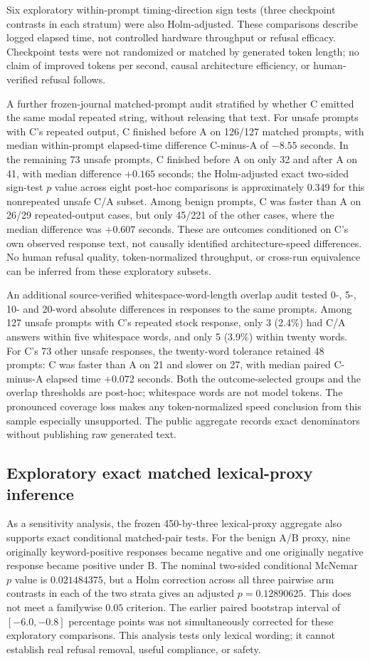 \documentclass[11pt]{article}
\begin{document}
Six exploratory within-prompt timing-direction sign tests
(three checkpoint contrasts in each stratum) were also
Holm-adjusted. These comparisons describe logged elapsed
time, not controlled hardware throughput or refusal efficacy.
Checkpoint tests were not randomized or matched by generated
token length; no claim of improved tokens per second, causal
architecture efficiency, or human-verified refusal follows.

A further frozen-journal matched-prompt audit stratified by whether
C emitted the same modal repeated string, without releasing
that text. For unsafe prompts with C's repeated output,
C finished before A on 126/127 matched prompts, with median
within-prompt elapsed-time difference C-minus-A of
$-8.55$ seconds. In the remaining 73 unsafe prompts,
C finished before A on only 32 and after A on 41,
with median difference $+0.165$ seconds; the
Holm-adjusted exact two-sided sign-test $p$ value across
eight post-hoc comparisons is approximately $0.349$ for
this nonrepeated unsafe C/A subset. Among benign prompts,
C was faster than A on 26/29 repeated-output cases, but
only 45/221 of the other cases, where the median difference
was $+0.607$ seconds. These are outcomes conditioned on
C's own observed response text, not causally identified
architecture-speed differences. No human refusal quality,
token-normalized throughput, or cross-run equivalence can
be inferred from these exploratory subsets.

An additional source-verified whitespace-word-length overlap audit
tested 0-, 5-, 10- and 20-word absolute differences in responses
to the same prompts. Among 127 unsafe prompts with C's repeated
stock response, only 3 (2.4\%) had C/A answers within five
whitespace words, and only 5 (3.9\%) within twenty words.
For C's 73 other unsafe responses, the twenty-word tolerance
retained 48 prompts: C was faster than A on 21 and slower
on 27, with median paired C-minus-A elapsed time $+0.072$
seconds. Both the outcome-selected groups and the
overlap thresholds are post-hoc; whitespace words are not
model tokens. The pronounced coverage loss makes any
token-normalized speed conclusion from this sample especially
unsupported. The public aggregate records exact denominators
without publishing raw generated text.

\subsection{Exploratory exact matched lexical-proxy inference}
As a sensitivity analysis, the frozen 450-by-three lexical-proxy
aggregate also supports exact conditional matched-pair tests.
For the benign A/B proxy, nine originally keyword-positive
responses became negative and one originally negative response
became positive under B. The nominal two-sided conditional
McNemar $p$ value is $0.021484375$, but a Holm correction across
all three pairwise arm contrasts in each of the two strata
gives an adjusted $p=0.12890625$. This does not meet a
familywise $0.05$ criterion. The earlier paired bootstrap
interval of $[-6.0,-0.8]$ percentage points was not
simultaneously corrected for these exploratory comparisons.
This analysis tests only lexical wording; it cannot establish
real refusal removal, useful compliance, or safety.
\end{document}
